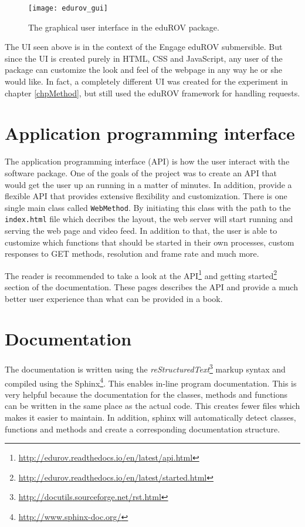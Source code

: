 \begin{figure}[h!]
    \centering
    \texttt{[image: edurov\_gui]}
    \caption{The graphical user interface in the eduROV package.}
    \label{edurov_gui}
\end{figure}

The UI seen above is in the context of the Engage eduROV submersible. But since the UI is created purely in HTML, CSS and JavaScript, any user of the package can customize the look and feel of the webpage in any way he or she would like. In fact, a completely different UI was created for the experiment in chapter \ref{chpMethod}, but still used the eduROV framework for handling requests.

\section{Application programming interface}

The application programming interface (API) is how the user interact with the software package. One of the goals of the project was to create an API that would get the user up an running in a matter of minutes. In addition, provide a flexible API that provides extensive flexibility and customization. There is one single main class called \texttt{WebMethod}. By initiating this class with the path to the \texttt{index.html} file which decribes the layout, the web server will start running and serving the web page and video feed. In addition to that, the user is able to customize which functions that should be started in their own processes, custom responses to GET methods, resolution and frame rate and much more.

The reader is recommended to take a look at the API\footnote{\url{http://edurov.readthedocs.io/en/latest/api.html}} and getting started\footnote{\url{http://edurov.readthedocs.io/en/latest/started.html}} section of the documentation. These pages describes the API and provide a much better user experience than what can be provided in a book. 


\section{Documentation}


The documentation is written using the \emph{reStructuredText}\footnote{\url{http://docutils.sourceforge.net/rst.html}} markup syntax and compiled using the Sphinx\footnote{\url{http://www.sphinx-doc.org/}}. This enables in-line program documentation. This is very helpful because the documentation for the classes, methods and functions can be written in the same place as the actual code. This creates fewer files which makes it easier to maintain. In addition, sphinx will automatically detect classes, functions and methods and create a corresponding documentation structure.

